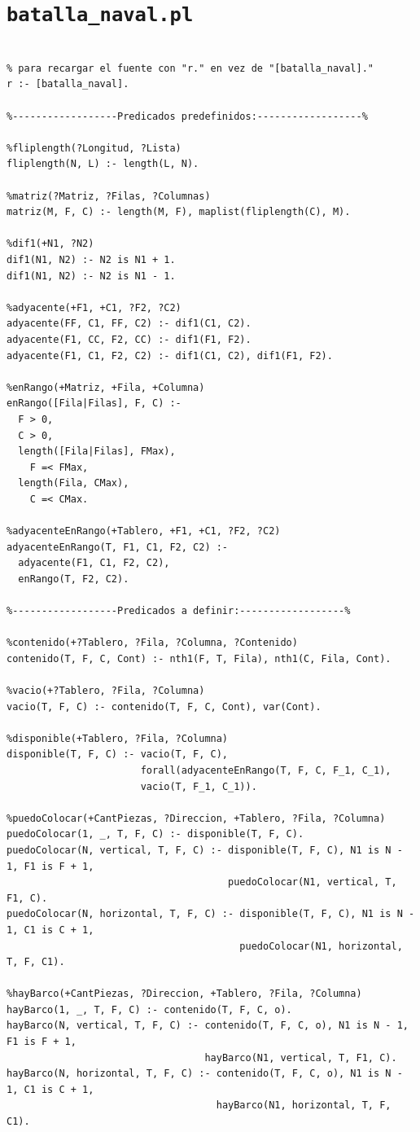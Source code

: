 \documentclass[a4paper]{article}
\begin{document}
\section{\texttt{batalla\_naval.pl}}
\begin{verbatim}

% para recargar el fuente con "r." en vez de "[batalla_naval]."
r :- [batalla_naval].

%------------------Predicados predefinidos:------------------%

%fliplength(?Longitud, ?Lista)
fliplength(N, L) :- length(L, N).

%matriz(?Matriz, ?Filas, ?Columnas)
matriz(M, F, C) :- length(M, F), maplist(fliplength(C), M).

%dif1(+N1, ?N2)
dif1(N1, N2) :- N2 is N1 + 1.
dif1(N1, N2) :- N2 is N1 - 1.

%adyacente(+F1, +C1, ?F2, ?C2)
adyacente(FF, C1, FF, C2) :- dif1(C1, C2).
adyacente(F1, CC, F2, CC) :- dif1(F1, F2).
adyacente(F1, C1, F2, C2) :- dif1(C1, C2), dif1(F1, F2).

%enRango(+Matriz, +Fila, +Columna)
enRango([Fila|Filas], F, C) :-
  F > 0,
  C > 0,
  length([Fila|Filas], FMax),
    F =< FMax,
  length(Fila, CMax),
    C =< CMax.

%adyacenteEnRango(+Tablero, +F1, +C1, ?F2, ?C2)
adyacenteEnRango(T, F1, C1, F2, C2) :-
  adyacente(F1, C1, F2, C2),
  enRango(T, F2, C2).

%------------------Predicados a definir:------------------%

%contenido(+?Tablero, ?Fila, ?Columna, ?Contenido)
contenido(T, F, C, Cont) :- nth1(F, T, Fila), nth1(C, Fila, Cont).

%vacio(+?Tablero, ?Fila, ?Columna)
vacio(T, F, C) :- contenido(T, F, C, Cont), var(Cont).

%disponible(+Tablero, ?Fila, ?Columna)
disponible(T, F, C) :- vacio(T, F, C), 
                       forall(adyacenteEnRango(T, F, C, F_1, C_1), 
                       vacio(T, F_1, C_1)).

%puedoColocar(+CantPiezas, ?Direccion, +Tablero, ?Fila, ?Columna)
puedoColocar(1, _, T, F, C) :- disponible(T, F, C).
puedoColocar(N, vertical, T, F, C) :- disponible(T, F, C), N1 is N - 1, F1 is F + 1, 
                                      puedoColocar(N1, vertical, T, F1, C).
puedoColocar(N, horizontal, T, F, C) :- disponible(T, F, C), N1 is N - 1, C1 is C + 1, 
                                        puedoColocar(N1, horizontal, T, F, C1).

%hayBarco(+CantPiezas, ?Direccion, +Tablero, ?Fila, ?Columna)
hayBarco(1, _, T, F, C) :- contenido(T, F, C, o).
hayBarco(N, vertical, T, F, C) :- contenido(T, F, C, o), N1 is N - 1, F1 is F + 1, 
                                  hayBarco(N1, vertical, T, F1, C).
hayBarco(N, horizontal, T, F, C) :- contenido(T, F, C, o), N1 is N - 1, C1 is C + 1, 
                                    hayBarco(N1, horizontal, T, F, C1).


\end{verbatim}
\end{document}
